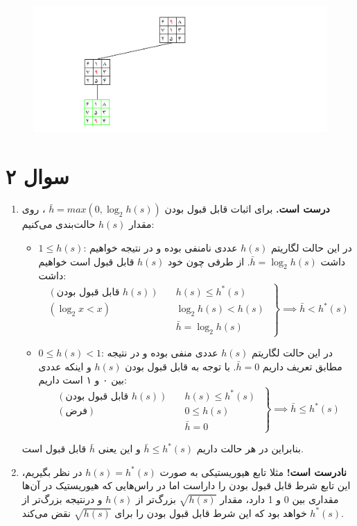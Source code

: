 \documentclass[a4paper, 11pt]{article}
\begin{document}
\begin{enumerate}[آ)]
		\begin{figure}[H]
		\centering
		\includegraphics[width=\textwidth]{pics/ids-3.png}
	\end{figure}
\end{enumerate}

\section*{سوال ۲}
\begin{enumerate}[آ)]
	\item \textbf{درست است.}
	برای اثبات قابل قبول بودن
	$\bar{h} = max(0, \log_2 h(s))$
	، روی مقدار $h(s)$ حالت‌بندی می‌کنیم:
	\begin{itemize}
		\item $1 \le h(s)$:
		در این حالت لگاریتم $h(s)$ عددی نامنفی بوده و در نتیجه خواهیم داشت 
		$\bar{h} = \log_2 h(s)$.
		از طرفی چون خود $h(s)$ قابل ‌قبول است خواهیم داشت:
		\[
		\left.\begin{aligned}
			(\text{قابل قبول بودن $h(s)$}) &\quad h(s) \le h^*(s) \; \\
			(\log_2 x < x) &\quad \log_2 h(s) < h(s) \; \\
			&\quad \bar{h} = \log_2 h(s)
		\end{aligned}\right\}\implies \bar{h} < h^*(s)
		\]
		\item $0 \le h(s) < 1 $:
		در این حالت لگاریتم $h(s)$ عددی منفی بوده و در نتیجه مطابق تعریف داریم
		$\bar{h} = 0$.
		با توجه به قابل قبول بودن $h(s)$ و اینکه عددی بین ۰ و ۱ است داریم:
		\[
		\left.\begin{aligned}
			(\text{قابل قبول بودن $h(s)$}) &\quad h(s) \le h^*(s) \; \\
			(\text{فرض}) &\quad 0 \le h(s) \; \\
			&\quad \bar{h} = 0
		\end{aligned}\right\}\implies \bar{h} \le h^*(s)
		\]
	\end{itemize}
	بنابراین در هر حالت داریم 
	$\bar{h} \le h^*(s)$
	و این یعنی 
	$\bar{h}$
	قابل قبول است.
	\item \textbf{نادرست است!}
	مثلا تابع هیوریستیکی به صورت 
	$h(s) = h^*(s)$
	در نظر بگیریم، این تابع شرط قابل قبول بودن را داراست اما در راس‌هایی که هیوریستیک در آن‌ها مقداری بین 0 و 1 دارد، مقدار 
	$\sqrt{h(s)}$
	بزرگ‌تر از $h(s)$ و درنتیجه بزرگ‌تر از $h^*(s)$ خواهد بود که این شرط قابل قبول بودن را برای 
	$\sqrt{h(s)}$
	نقض می‌کند.
\end{enumerate}
\end{document}
